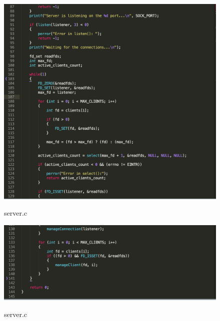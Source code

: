 \documentclass[a4paper,12pt]{article}
\begin{document}
	\newpage

	\begin{figure}[h!]
		\begin{center}
			{\includegraphics[scale = 0.6]{server3_2.png}}
			\label{ris:server3_2}
		\end{center}
		\caption{server.c}
	\end{figure}


	\begin{figure}[h!]
		\begin{center}
			{\includegraphics[scale = 0.6]{server4_2.png}}
			\label{ris:server4_2}
		\end{center}
		\caption{server.c}
	\end{figure}

	\newpage
	
\end{document}
